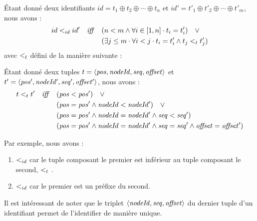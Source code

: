 \begin{definition}
  Étant donné deux identifiants $id = t_1 \oplus t_2 \oplus \cdots \oplus t_n$ et $id' = t'_1 \oplus t'_2 \oplus \cdots \oplus t'_m$, nous avons :
  \begin{equation*}
    \begin{split}
      id <_{id} id' \quad \mathit{iff} \quad     & (n < m \land \forall i \in [1,n] \cdot t_i = t'_i) \quad \lor \\
                                            & (\exists j \leq m \cdot \forall i < j \cdot t_i = t'_i \land t_j <_{t} t'_j) \\
    \end{split}
  \end{equation*}
  avec $<_{t}$ défini de la manière suivante :
  \begin{subdefinition}
    Étant donné deux tuples $t = \langle \mathit{pos},\mathit{nodeId},\mathit{seq},\mathit{offset} \rangle$ et $t' = \langle \mathit{pos'},\mathit{nodeId'},\mathit{seq'},\mathit{offset'} \rangle$, nous avons :
    \begin{equation*}
      \begin{split}
        t <_{t} t' \quad \mathit{iff} \quad  & (\mathit{pos} < \mathit{pos}') \quad \lor \\
                                            & (\mathit{pos} = \mathit{pos'} \land \mathit{nodeId} < \mathit{nodeId'}) \quad \lor \\
                                            & (\mathit{pos} = \mathit{pos'} \land \mathit{nodeId} = \mathit{nodeId'} \land \mathit{seq} < \mathit{seq'}) \\
                                            & (\mathit{pos} = \mathit{pos'} \land \mathit{nodeId} = \mathit{nodeId'} \land \mathit{seq} = \mathit{seq'} \land \mathit{offset} = \mathit{offset'}) \\
      \end{split}
    \end{equation*}
  \end{subdefinition}
\end{definition}

Par exemple, nous avons :
\begin{enumerate}
  \item  {} $<_{id}$  car le tuple composant le premier est inférieur au tuple composant le second, \ie {} $<_{t}$ .
  \item {} $<_{id}$  car le premier est un préfixe du second.
\end{enumerate}

Il est intéressant de noter que le triplet $\langle \mathit{nodeId},\mathit{seq},\mathit{offset} \rangle$ du dernier tuple d'un identifiant permet de l'identifier de manière unique.

